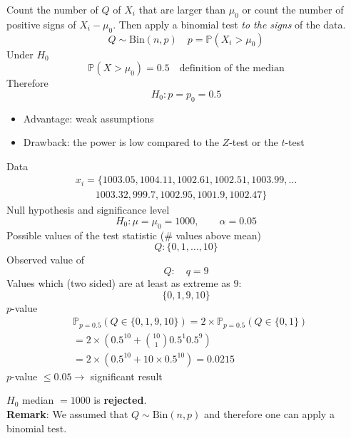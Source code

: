 Count the number of $Q$ of $X_i$ that are larger than $\mu_0$ or count the number of positive signs of $X_i-\mu_0$. Then apply a binomial test \textit{to the signs} of the data.
\begin{equation*}
    Q \sim \text{Bin}(n,p) \quad p=\mathbb{P}(X_i > \mu_0)
\end{equation*}
Under $H_0$
\begin{equation*}
    \mathbb{P}(X > \mu_0)=0.5 \quad \text{definition of the median}
\end{equation*}
Therefore
\begin{equation*}
    H_0: p=p_0=0.5
\end{equation*}

\newpar{}
\begin{itemize}
    \item Advantage: weak assumptions
    \item Drawback: the power is low compared to the $Z$-test or the $t$-test
\end{itemize}

\begin{examplesection}
    Data
    \noindent\begin{gather*}
        x_i = \{1003.05, 1004.11, 1002.61, 1002.51, 1003.99, \ldots \\
        \qquad 1003.32, 999.7, 1002.95, 1001.9, 1002.47\}
    \end{gather*}
    Null hypothesis and significance level
    \begin{equation*}
        H_0: \mu=\mu_0=1000, \qquad \alpha=0.05
    \end{equation*}
    Possible values of the test statistic ($\#$ values above mean)
    \begin{equation*}
        Q: \{0,1,\ldots,10\}
    \end{equation*}
    \newpar{}
    Observed value of
    \begin{equation*}
        Q: \quad q=9
    \end{equation*}
    \newpar{}
    Values which (two sided) are at least as extreme as $9$:
    \begin{equation*}
        \{0,1,9,10\}
    \end{equation*}
    \newpar{}
    $p$-value
    \begin{align*}
         & \mathbb{P}_{p=0.5}(Q\in\{0,1,9,10\})=2\times\mathbb{P}_{p=0.5}(Q\in\{0,1\}) \\
         & = 2\times\left(0.5^{10} + {10 \choose 1} 0.5^1 0.5^9\right)                 \\
         & = 2\times\left(0.5^{10}+ 10\times 0.5^{10}\right)= 0.0215
    \end{align*}
    $p$-value $\leq 0.05 \rightarrow$ significant result

    $H_0$ median $= 1000$ is \textbf{rejected}.\\
    \textbf{Remark}: We assumed that $Q \sim \text{Bin}(n,p)$ and therefore one can apply a binomial test.
\end{examplesection}

